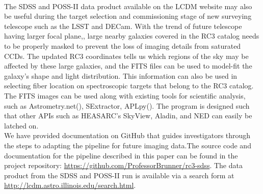 \documentclass[5p]{elsarticle}
\begin{document}
\\
\indent The SDSS and POSS-II data product available on the LCDM website may also be useful  during  the target selection and commissioning stage of new surveying telescope such as the LSST and DECam. With the trend of future telescope having larger focal plane,, large nearby galaxies covered in the RC3 catalog needs to be properly masked to prevent the loss of imaging details from saturated CCDs. The updated RC3 coordinates tells us  which regions of the sky may be affected by these large galaxies, and the FITS files can be used to model-fit the galaxy's shape and light distribution. This information can also be used in selecting fiber location on spectroscopic targets that belong to the RC3 catalog. The FITS images can be used along with existing tools for scientific analysis, such as Astrometry.net(\citet{astrometry.net}), SExtractor, APLpy(\citet{aplpy}). The program is designed such that other APIs such as HEASARC's SkyView, Aladin, and NED can easily be latched on.
\\
\indent We have provided documentation on GitHub  that guides investigators through the steps to adapting the pipeline for future imaging data.The source code and documentation for the pipeline described in this paper can be found in the project repository: \url{https://github.com/ProfessorBrunner/rc3-sdss}. The data product from the SDSS and POSS-II run is available via a search form at \url{http://lcdm.astro.illinois.edu/search.html}.
\end{document}
